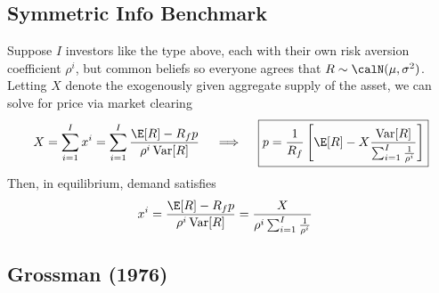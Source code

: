 \documentclass[12pt]{article}
\theoremstyle{plain}
\theoremstyle{definition}
\theoremstyle{remark}
\newcommand{\Var}{\operatorname{Var}}
\begin{document}
\subsection{Symmetric Info Benchmark}

Suppose $I$ investors like the type above, each with their own risk
aversion coefficient $\rho^i$, but common beliefs so everyone agrees
that $R\sim\calN(\mu,\sigma^2)$.
Letting $X$ denote the exogenously given aggregate supply of the asset,
we can solve for price via market clearing
\begin{align*}
  X =
  \sum_{i=1}^I
  x^i
  =
  \sum_{i=1}^I
  \frac{\E[R] - R_fp}{\rho^i\Var[R]}
  \quad\implies\quad
  \boxed{%
    p
    =
    \frac{1}{R_f}
    \left[
    \E[R]
    -
    X
    \frac{\Var[R]}{ \sum_{i=1}^I \frac{1}{\rho^i} }
    \right]
  }
\end{align*}
Then, in equilibrium, demand satisfies
\begin{align*}
  x^i &=
  \frac{\E[R] - R_fp}{\rho^i\Var[R]}
  =
  \frac{X}{ \rho^i\sum_{i=1}^I \frac{1}{\rho^i} }
\end{align*}


\subsection{Grossman (1976)}
\end{document}
